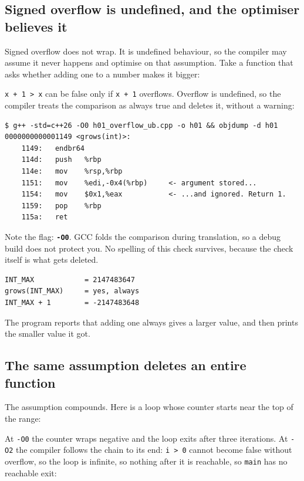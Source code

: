 \documentclass[11pt,a4paper]{article}
\newcommand{\code}[1]{\texttt{\small #1}}
\begin{document}
\subsection{Signed overflow is undefined, and the optimiser believes it}

Signed overflow does not wrap. It is undefined behaviour, so the compiler may
assume it never happens and optimise on that assumption. Take a function that
asks whether adding one to a number makes it bigger:



\noindent
\code{x + 1 > x} can be false only if \code{x + 1} overflows. Overflow is
undefined, so the compiler treats the comparison as always true and deletes it,
without a warning:

\begin{lstlisting}[style=term]
$ g++ -std=c++26 -O0 h01_overflow_ub.cpp -o h01 && objdump -d h01
0000000000001149 <grows(int)>:
    1149:   endbr64
    114d:   push   %rbp
    114e:   mov    %rsp,%rbp
    1151:   mov    %edi,-0x4(%rbp)     <- argument stored...
    1154:   mov    $0x1,%eax           <- ...and ignored. Return 1.
    1159:   pop    %rbp
    115a:   ret
\end{lstlisting}

\noindent
Note the flag: \textbf{\code{-O0}}. GCC folds the comparison during
translation, so a debug build does not protect you. No spelling of this check
survives, because the check itself is what gets deleted.

\begin{lstlisting}[style=term]
INT_MAX            = 2147483647
grows(INT_MAX)     = yes, always
INT_MAX + 1        = -2147483648
\end{lstlisting}

\noindent
The program reports that adding one always gives a larger value, and then
prints the smaller value it got.

\subsection{The same assumption deletes an entire function}

The assumption compounds. Here is a loop whose counter starts near the top of
the range:



\noindent
At \code{-O0} the counter wraps negative and the loop exits after three
iterations. At \code{-O2} the compiler follows the chain to its end:
\code{i > 0} cannot become false without overflow, so the loop is infinite, so
nothing after it is reachable, so \code{main} has no reachable exit:
\end{document}
